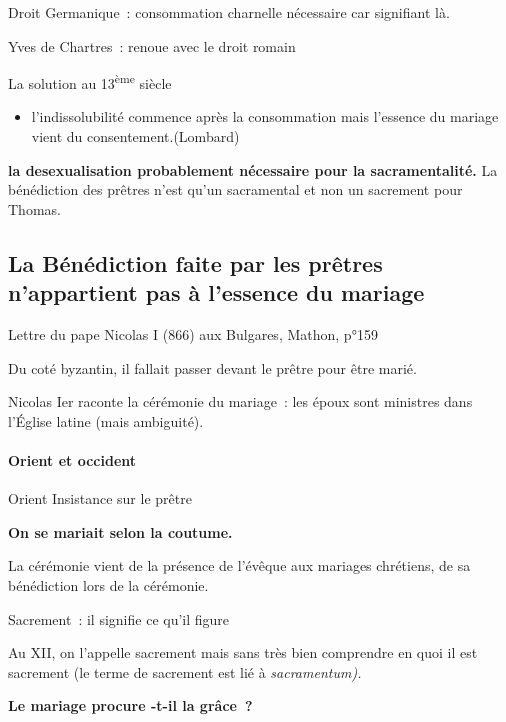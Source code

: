 Droit Germanique~: consommation charnelle nécessaire car signifiant là.

Yves de Chartres~: renoue avec le droit romain

La solution au 13\textsuperscript{ème} siècle

\begin{itemize}
\item
   
  l'indissolubilité commence après la consommation mais l'essence du
  mariage vient du consentement.(Lombard)
   
\end{itemize}

\textbf{la desexualisation probablement nécessaire pour la
sacramentalité.} La bénédiction des prêtres n'est qu'un sacramental et
non un sacrement pour Thomas.

\hypertarget{la-buxe9nuxe9diction-faite-par-les-pruxeatres-nappartient-pas-uxe0-lessence-du-mariage}{%
\subsection{La Bénédiction faite par les prêtres n'appartient pas à
l'essence du
mariage}\label{la-buxe9nuxe9diction-faite-par-les-pruxeatres-nappartient-pas-uxe0-lessence-du-mariage}}

Lettre du pape Nicolas I (866) aux Bulgares, Mathon, p°159

Du coté byzantin, il fallait passer devant le prêtre pour être marié.

Nicolas Ier raconte la cérémonie du mariage~: les époux sont ministres
dans l'Église latine (mais ambiguité).

\hypertarget{orient-et-occident}{%
\paragraph{Orient et occident}\label{orient-et-occident}}

Orient Insistance sur le prêtre

\textbf{On se mariait selon la coutume.}

La cérémonie vient de la présence de l'évêque aux mariages chrétiens, de
sa bénédiction lors de la cérémonie.

Sacrement~: il signifie ce qu'il figure

Au XII, on l'appelle sacrement mais sans très bien comprendre en quoi il
est sacrement (le terme de sacrement est lié à \emph{sacramentum).}

\textbf{Le mariage procure -t-il la grâce~?}

